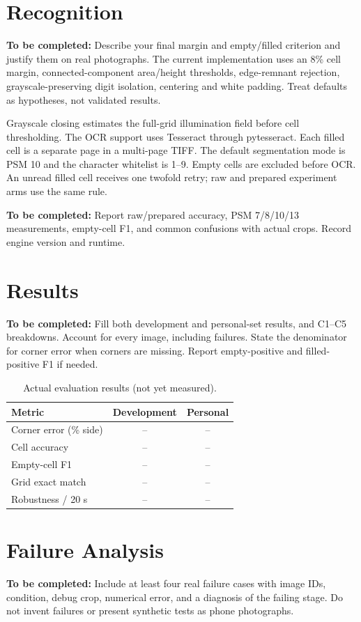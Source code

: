 \documentclass[conference]{IEEEtran}
\newcommand{\draftnote}[1]{\par\noindent\textbf{To be completed:} #1\par}
\begin{document}
\section{Recognition}
\draftnote{Describe your final margin and empty/filled criterion and justify them
on real photographs. The current implementation uses an 8\% cell margin, connected-component
area/height thresholds, edge-remnant rejection, grayscale-preserving digit
isolation, centering and white padding. Treat defaults as hypotheses, not validated results.}
Grayscale closing estimates the full-grid illumination field before cell thresholding.
The OCR support uses Tesseract through pytesseract. Each filled cell is a separate
page in a multi-page TIFF. The default segmentation mode is PSM 10 and the
character whitelist is 1--9. Empty cells are excluded before OCR. An unread filled
cell receives one twofold retry; raw and prepared experiment arms use the same rule.
\draftnote{Report raw/prepared accuracy, PSM 7/8/10/13 measurements, empty-cell F1,
and common confusions with actual crops. Record engine version and runtime.}

\section{Results}
\draftnote{Fill both development and personal-set results, and C1--C5 breakdowns.
Account for every image, including failures. State the denominator for corner
error when corners are missing. Report empty-positive and filled-positive F1 if needed.}
\begin{table}[ht]
\centering
\caption{Actual evaluation results (not yet measured).}
\begin{tabular}{lcc}
\toprule
Metric & Development & Personal\\
\midrule
Corner error (\% side) & -- & --\\
Cell accuracy & -- & --\\
Empty-cell F1 & -- & --\\
Grid exact match & -- & --\\
Robustness / 20 s & -- & --\\
\bottomrule
\end{tabular}
\end{table}

\section{Failure Analysis}
\draftnote{Include at least four real failure cases with image IDs, condition,
debug crop, numerical error, and a diagnosis of the failing stage. Do not invent
failures or present synthetic tests as phone photographs.}
\end{document}
